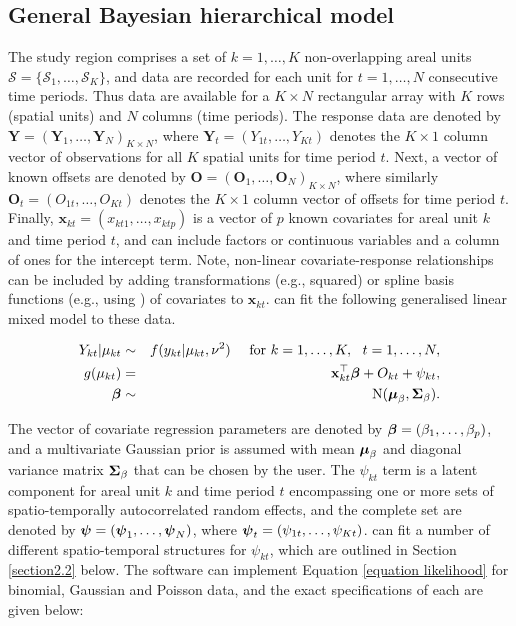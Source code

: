 \documentclass[article, nojss]{jss}
\newcommand{\bd}[1]{\ensuremath{\mbox{\boldmath $#1$}}}
\begin{document}
\subsection{General Bayesian hierarchical model}
The study region comprises a set of $k=1,\ldots,K$ non-overlapping areal units $\mathcal{S}=\{\mathcal{S}_{1},\ldots,\mathcal{S}_{K}\}$, and data are recorded for each unit for $t=1,\ldots,N$ consecutive time periods. Thus data are available for a $K\times N$ rectangular array with $K$ rows (spatial units) and $N$ columns (time periods). The response data are denoted by $\mathbf{Y}=(\mathbf{Y}_{1},\ldots,\mathbf{Y}_{N})_{K\times N}$, where $\mathbf{Y}_{t}=(Y_{1t},\ldots,Y_{Kt})$ denotes the $K\times 1$ column vector of observations for all $K$ spatial units for time period $t$. Next, a vector of known offsets are denoted by $\mathbf{O}=(\mathbf{O}_{1},\ldots,\mathbf{O}_{N})_{K\times N}$, where similarly $\mathbf{O}_{t}=(O_{1t},\ldots,O_{Kt})$ denotes the $K\times 1$ column  vector of offsets for time period $t$. Finally, $\mathbf{x}_{kt}=(x_{kt1},\ldots, x_{ktp})$ is a vector of $p$ known covariates for areal unit $k$ and time period $t$, and can include factors or continuous variables and a column of ones for the intercept term. Note, non-linear covariate-response relationships can be included by adding transformations (e.g., squared) or spline basis functions (e.g., using ) of covariates to $\mathbf{x}_{kt}$.  can fit the following generalised linear mixed model to these data.

\begin{eqnarray}
Y_{kt}|\mu_{kt}&\sim&f(y_{kt}|\mu_{kt},\nu^{2})~~~~\mbox{for }k=1,\ldots,K,~~t=1,\ldots,N,\label{equation likelihood}\\
g(\mu_{kt})&=&\mathbf{x}_{kt}^{\top}\bd{\beta} + O_{kt} + \psi_{kt},\nonumber\\
\bd{\beta}&\sim&\mbox{N}(\bd{\mu}_{\beta}, \bd{\Sigma}_{\beta}).\nonumber
\end{eqnarray}

The vector of covariate regression parameters are denoted by $\bd{\beta}=(\beta_{1},\ldots,\beta_{p})$, and a multivariate Gaussian prior is assumed with mean $\bd{\mu}_{\beta}$ and diagonal variance matrix $\bd{\Sigma}_{\beta}$  that can be chosen by the user. The $\psi_{kt}$ term is a latent component for areal unit $k$ and time period $t$ encompassing one or more sets of spatio-temporally autocorrelated random effects, and the complete set are denoted by $\bd{\psi}=(\bd{\psi}_{1},\ldots,\bd{\psi}_{N})$, where $\bd{\psi}_{t}=(\psi_{1t},\ldots,\psi_{Kt})$.  can fit a number of different spatio-temporal structures for $\psi_{kt}$, which are outlined in Section \ref{section2.2} below. The software can implement Equation \ref{equation likelihood} for binomial, Gaussian and Poisson data, and the exact specifications of each are given below:
\end{document}

